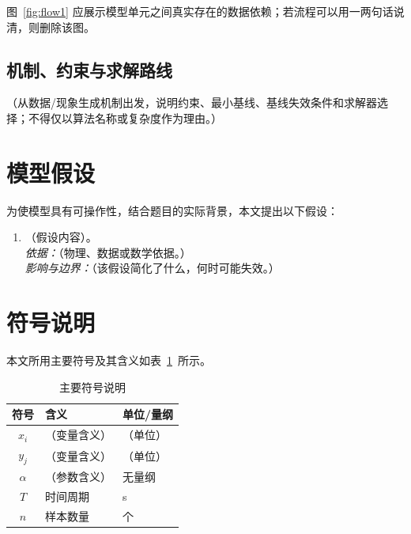 \documentclass[12pt, a4paper]{article}
\begin{document}
图~\ref{fig:flow1} 应展示模型单元之间真实存在的数据依赖；若流程可以用一两句话说清，则删除该图。

\subsection{机制、约束与求解路线}

（从数据/现象生成机制出发，说明约束、最小基线、基线失效条件和求解器选择；不得仅以算法名称或复杂度作为理由。）

\section{模型假设}

为使模型具有可操作性，结合题目的实际背景，本文提出以下假设：

\begin{enumerate}[label=\textbf{假设\arabic*：}, leftmargin=*]
    \item \label{assump:h1}（假设内容）。\\
          \textit{依据：}（物理、数据或数学依据。）\\
          \textit{影响与边界：}（该假设简化了什么，何时可能失效。）

\end{enumerate}

\section{符号说明}

本文所用主要符号及其含义如表~\ref{tab:symbols}~所示。

\begin{table}[H]
\centering
\caption{主要符号说明}
\label{tab:symbols}
\begin{tabular}{cll}
\toprule
\textbf{符号} & \textbf{含义} & \textbf{单位/量纲} \\
\midrule
$x_i$  & （变量含义）     & （单位） \\
$y_j$  & （变量含义）     & （单位） \\
$\alpha$ & （参数含义）   & 无量纲 \\
$T$    & 时间周期         & s \\
$n$    & 样本数量         & 个 \\
\bottomrule
\end{tabular}
\end{table}
\end{document}
